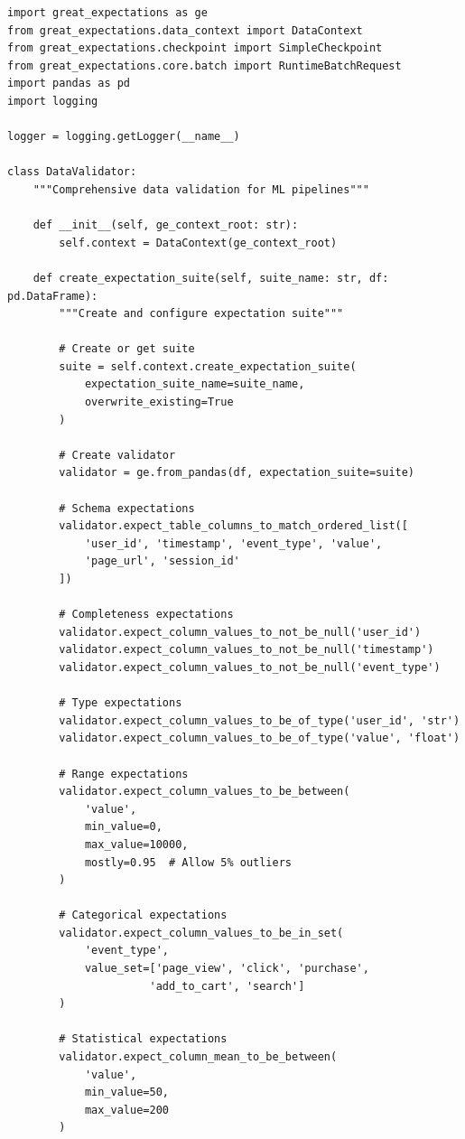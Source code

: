 \begin{lstlisting}[style=python, caption=Comprehensive data validation with Great Expectations]
import great_expectations as ge
from great_expectations.data_context import DataContext
from great_expectations.checkpoint import SimpleCheckpoint
from great_expectations.core.batch import RuntimeBatchRequest
import pandas as pd
import logging

logger = logging.getLogger(__name__)

class DataValidator:
    """Comprehensive data validation for ML pipelines"""

    def __init__(self, ge_context_root: str):
        self.context = DataContext(ge_context_root)

    def create_expectation_suite(self, suite_name: str, df: pd.DataFrame):
        """Create and configure expectation suite"""

        # Create or get suite
        suite = self.context.create_expectation_suite(
            expectation_suite_name=suite_name,
            overwrite_existing=True
        )

        # Create validator
        validator = ge.from_pandas(df, expectation_suite=suite)

        # Schema expectations
        validator.expect_table_columns_to_match_ordered_list([
            'user_id', 'timestamp', 'event_type', 'value',
            'page_url', 'session_id'
        ])

        # Completeness expectations
        validator.expect_column_values_to_not_be_null('user_id')
        validator.expect_column_values_to_not_be_null('timestamp')
        validator.expect_column_values_to_not_be_null('event_type')

        # Type expectations
        validator.expect_column_values_to_be_of_type('user_id', 'str')
        validator.expect_column_values_to_be_of_type('value', 'float')

        # Range expectations
        validator.expect_column_values_to_be_between(
            'value',
            min_value=0,
            max_value=10000,
            mostly=0.95  # Allow 5% outliers
        )

        # Categorical expectations
        validator.expect_column_values_to_be_in_set(
            'event_type',
            value_set=['page_view', 'click', 'purchase',
                      'add_to_cart', 'search']
        )

        # Statistical expectations
        validator.expect_column_mean_to_be_between(
            'value',
            min_value=50,
            max_value=200
        )


\end{lstlisting}

